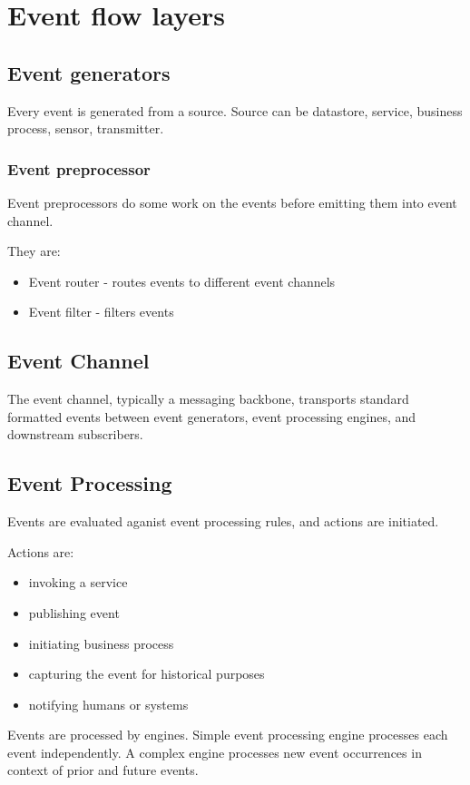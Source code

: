 \documentclass[12pt, a4paper]{article}
\begin{document}
\section{Event flow layers}

\subsection{Event generators}
Every event is generated from a source. Source can be datastore, service, business process, sensor, transmitter.

\subsubsection{Event preprocessor}
Event preprocessors do some work on the events before emitting them into event channel. 

They are:
\begin{itemize}
  \item Event router - routes events to different event channels
  \item Event filter - filters events
\end{itemize}

\subsection{Event Channel}
The event channel, typically a messaging backbone, transports standard formatted events between event generators, event processing engines, and downstream subscribers.

\subsection{Event Processing}
Events are evaluated aganist event processing rules, and actions are initiated. 

Actions are:
\begin{itemize}
  \item invoking a service
  \item publishing event
  \item initiating business process
  \item capturing the event for historical purposes
  \item notifying humans or systems
\end{itemize}

Events are processed by engines. Simple event processing engine processes each event independently. A complex engine processes new event occurrences in context of prior and future events.
\end{document}

